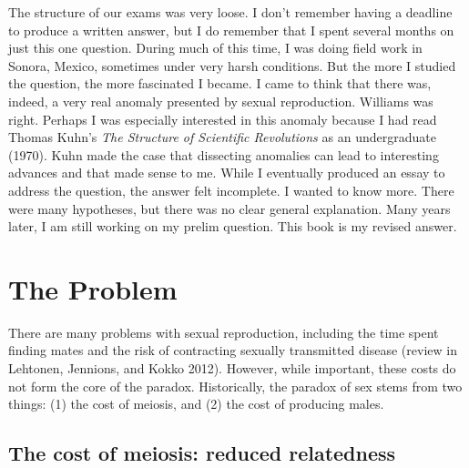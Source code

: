 \documentclass[
  letterpaper,
]{book}
\begin{document}
The structure of our exams was very loose. I don't remember having a
deadline to produce a written answer, but I do remember that I spent
several months on just this one question. During much of this time, I
was doing field work in Sonora, Mexico, sometimes under very harsh
conditions. But the more I studied the question, the more fascinated I
became. I came to think that there was, indeed, a very real anomaly
presented by sexual reproduction. Williams was right. Perhaps I was
especially interested in this anomaly because I had read Thomas Kuhn's
\emph{The Structure of Scientific Revolutions} as an undergraduate
(1970). Kuhn made the case that dissecting anomalies can lead to
interesting advances and that made sense to me. While I eventually
produced an essay to address the question, the answer felt incomplete. I
wanted to know more. There were many hypotheses, but there was no clear
general explanation. Many years later, I am still working on my prelim
question. This book is my revised answer.

\hypertarget{the-problem}{%
\section{The Problem}\label{the-problem}}

There are many problems with sexual reproduction, including the time
spent finding mates and the risk of contracting sexually transmitted
disease (review in Lehtonen, Jennions, and Kokko 2012). However, while
important, these costs do not form the core of the paradox.
Historically, the paradox of sex stems from two things: (1) the cost of
meiosis, and (2) the cost of producing males.

\hypertarget{the-cost-of-meiosis-reduced-relatedness}{%
\subsection{The cost of meiosis: reduced
relatedness}\label{the-cost-of-meiosis-reduced-relatedness}}
\end{document}
